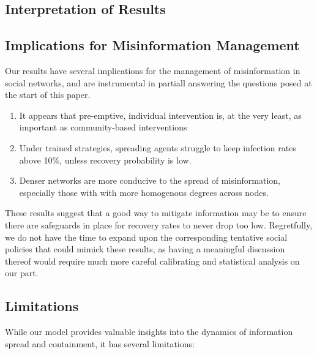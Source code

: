 \documentclass[12pt]{article}
\begin{document}
\subsection{Interpretation of Results}


\subsection{Implications for Misinformation Management}

Our results have several implications for the management of misinformation in social networks, and are instrumental in 
partiall answering the questions posed at the start of this paper. 

\begin{enumerate}
    \item It appears that pre-emptive, individual intervention is, at the very least, as important as community-based interventions
    \item Under trained strategies, spreading agents struggle to keep infection rates above 10\%, unless recovery probability is low. 
    \item Denser networks are more conducive to the spread of misinformation, especially those with with more homogenous degrees across nodes. 
\end{enumerate}

These results suggest that a good way to mitigate information may be to ensure there are safeguards in place for recovery rates to never drop too low. Regretfully, we do not have the time to expand upon the corresponding tentative social policies that could mimick these results, as having a meaningful discussion thereof would require much more careful calibrating and statistical analysis on our part. 

\subsection{Limitations}
While our model provides valuable insights into the dynamics of information spread and containment, it has several limitations:
\end{document}
